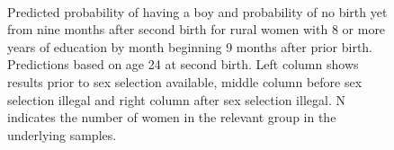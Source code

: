 \documentclass[12pt,letterpaper]{article}
\begin{document}
\begin{figure}[htpb]
{\begin{minipage}{0.31\textwidth}
        \captionsetup[subfigure]{labelformat=empty,position=top,captionskip=-1pt,farskip=-0.5pt}
        \\
        \captionsetup[subfigure]{labelformat=parens}
    \end{minipage}
}
\setcounter{subfigure}{3}
\caption{Predicted probability of having a boy and probability of
no birth yet from nine months after second birth for rural
women with 8 or more years of education by month beginning 9 months after prior birth. 
Predictions based on age 24 at second birth.
Left column shows results prior to sex selection available, middle column before
sex selection illegal and right column after sex selection illegal.
N indicates the number of women in the relevant group in the underlying samples.
}
\label{fig:results_spell3_high_rural}
\end{figure}
\end{document}
